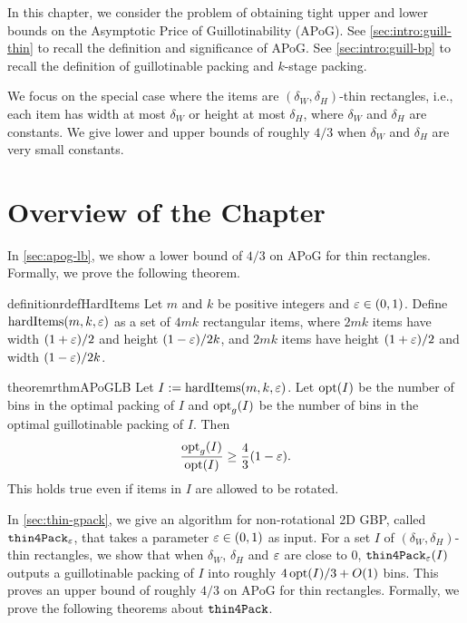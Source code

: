 In this chapter, we consider the problem of obtaining tight upper and lower bounds
on the Asymptotic Price of Guillotinability (APoG).
See \cref{sec:intro:guill-thin} to recall the definition and significance of APoG.
See \cref{sec:intro:guill-bp} to recall the definition of guillotinable packing
and $k$-stage packing.

We focus on the special case where the items are
$(\delta_W, \delta_H)$-thin rectangles, i.e., each item has
width at most $\delta_W$ or height at most $\delta_H$,
where $\delta_W$ and $\delta_H$ are constants.
We give lower and upper bounds of roughly $4/3$ when
$\delta_W$ and $\delta_H$ are very small constants.

\section{Overview of the Chapter}

In \cref{sec:apog-lb}, we show a lower bound of $4/3$ on APoG
for thin rectangles. Formally, we prove the following theorem.

\begin{restatable}{definition}{rdefHardItems}
Let $m$ and $k$ be positive integers and $\varepsilon \in (0, 1)$.
Define $\operatorname{hardItems}(m, k, \varepsilon)$ as a set of $4mk$ rectangular items,
where $2mk$ items have width $(1+\varepsilon)/2$ and height $(1-\varepsilon)/2k$,
and $2mk$ items have height $(1+\varepsilon)/2$ and width $(1-\varepsilon)/2k$.
\end{restatable}

\begin{restatable}{theorem}{rthmAPoGLB}
\label{thm:apog-lb}
Let $I := \operatorname{hardItems}(m, k, \varepsilon)$. Let $\operatorname{opt}(I)$ be the number of bins in the
optimal packing of $I$ and $\operatorname{opt}_g(I)$ be the number of bins in the
optimal guillotinable packing of $I$. Then
\[ \frac{\operatorname{opt}_g(I)}{\operatorname{opt}(I)} \ge \frac{4}{3} (1-\varepsilon). \]
This holds true even if items in $I$ are allowed to be rotated.
\end{restatable}

In \cref{sec:thin-gpack}, we give an algorithm for non-rotational 2D GBP,
called $\operatorname{\mathtt{thin4Pack}}_{\varepsilon}$, that takes a parameter $\varepsilon \in (0, 1)$ as input.
For a set $I$ of $(\delta_W, \delta_H)$-thin rectangles, we show that when
$\delta_W$, $\delta_H$ and $\varepsilon$ are close to 0, $\operatorname{\mathtt{thin4Pack}}_{\varepsilon}(I)$ outputs a
guillotinable packing of $I$ into roughly $4\operatorname{opt}(I)/3 + O(1)$ bins.
This proves an upper bound of roughly $4/3$ on APoG for thin rectangles.
Formally, we prove the following theorems about $\operatorname{\mathtt{thin4Pack}}$.

